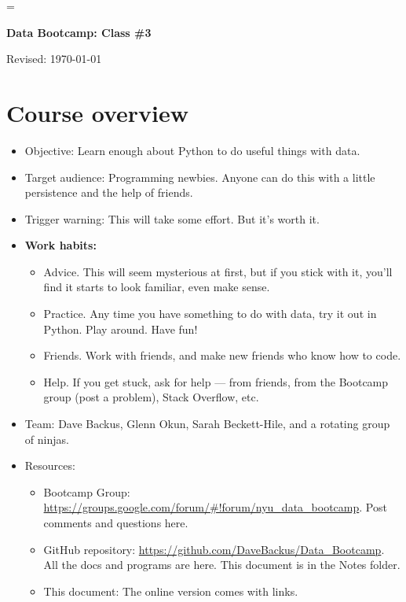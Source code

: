 \documentclass[11pt]{article}
\begin{document}
\parskip=\bigskipamount
\parindent=0.0in
\thispagestyle{empty}


\bigskip\bigskip
\centerline{\Large \bf Data Bootcamp:  Class \#3}
\centerline{Revised: \today}

\begin{comment}
* Today:  control, data frames 
* Before we start
    - start Spyder
    - download bootcamp_control.py
\end{comment}


\section{Course overview}

\begin{itemize}
\item Objective:  Learn enough about Python to do useful things with data.
\item Target audience:  Programming newbies.
Anyone can do this with a little persistence and the help of friends.
\item Trigger warning:  This will take some effort.  But it's worth it.

\item {\bf Work habits:}
\begin{itemize}
\item Advice.  This will seem mysterious at first, but if you stick with it,
you'll find it starts to look familiar, even make sense.
\item Practice.  Any time you have something to do with data, try it out in Python.
Play around.  Have fun!
\item Friends.  Work with friends, and make new friends who know how to code.
\item Help.  If you get stuck, ask for help --- from friends,
from the Bootcamp group (post a problem), Stack Overflow, etc.
\end{itemize}
\item Team:  Dave Backus, Glenn Okun, Sarah Beckett-Hile, and a rotating group of ninjas.

\item Resources:
\begin{itemize}
\item Bootcamp Group:  \url{https://groups.google.com/forum/#!forum/nyu_data_bootcamp}.
Post comments and questions here.

\item GitHub repository:  \url{https://github.com/DaveBackus/Data_Bootcamp}.
All the docs and programs are here.  This document is in the Notes folder.

\item This document:  The online version comes with links.
\end{itemize}

\end{itemize}
\end{document}
